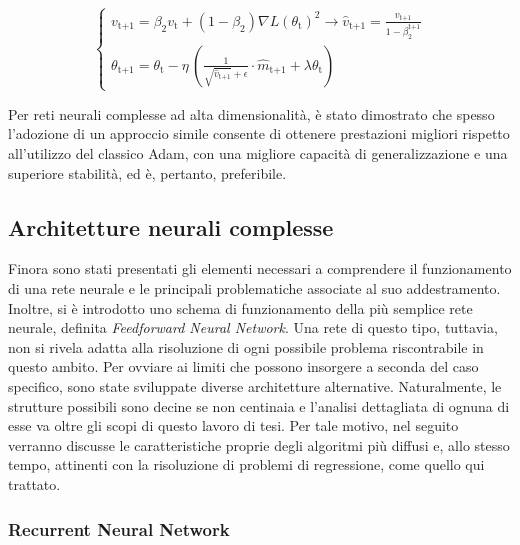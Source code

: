 \begin{itemize}
\begin{equation}
\begin{cases}
                    v_{\text{t+1}} = \displaystyle \beta_{2} v_{\text{t}} + (1 - \beta_{2}) \nabla L(\theta_{\text{t}})^{2} \rightarrow \hat{v}_{\text{t+1}} = \frac{v_{\text{t+1}}}{1 - \beta_{2}^{\text{t+1}}} \\[0.35cm]

                    \theta_{\text{t+1}} = \displaystyle \theta_{\text{t}} - \eta \, \left(\frac{1}{\sqrt{\hat{v}_{\text{t+1}}} + \epsilon} \cdot \hat{m}_{\text{t+1}} + \lambda \theta_{\text{t}}\right)
                \end{cases}
                \label{eq:AdamW}
            \end{equation}

        Per reti neurali complesse ad alta dimensionalità, è stato dimostrato che spesso l'adozione di un approccio simile consente di ottenere prestazioni migliori rispetto all'utilizzo del classico Adam, con una migliore capacità di generalizzazione e una superiore stabilità, ed è, pertanto, preferibile. 
        
    \end{itemize}


\subsection{Architetture neurali complesse}

Finora sono stati presentati gli elementi necessari a comprendere il funzionamento di una rete neurale e le principali problematiche associate al suo addestramento. Inoltre, si è introdotto uno schema di funzionamento della più semplice rete neurale, definita \emph{Feedforward Neural Network}. Una rete di questo tipo, tuttavia, non si rivela adatta alla risoluzione di ogni possibile problema riscontrabile in questo ambito. Per ovviare ai limiti che possono insorgere a seconda del caso specifico, sono state sviluppate diverse architetture alternative. Naturalmente, le strutture possibili sono decine se non centinaia e l'analisi dettagliata di ognuna di esse va oltre gli scopi di questo lavoro di tesi. Per tale motivo, nel seguito verranno discusse le caratteristiche proprie degli algoritmi più diffusi e, allo stesso tempo, attinenti con la risoluzione di problemi di regressione, come quello qui trattato. 

\subsubsection{Recurrent Neural Network}

